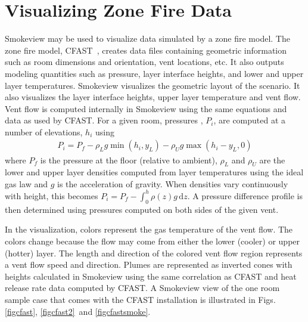 \documentclass[11pt,twoside]{book}
\begin{document}
\chapter{Visualizing Zone Fire Data}
Smokeview may be used to visualize data simulated by a zone fire
model. The zone fire model, CFAST~\cite{CFAST_Tech_Guide_6}, creates data
files containing geometric information such as room dimensions and
orientation, vent locations, etc.  It also outputs modeling
quantities such as pressure, layer interface heights, and lower
and upper layer temperatures. Smokeview visualizes the geometric
layout of the scenario.  It also visualizes the layer interface
heights, upper layer temperature and vent flow. Vent flow is
computed internally in Smokeview using the same equations and data
as used by CFAST.   For a given room, pressures , $P_i$, are
computed at a number of elevations, $h_i$ using
\begin{eqnarray}
P_i=P_f - \rho_L g \min(h_i,y_L) - \rho_U g \max(h_i-y_L,0)
\end{eqnarray}
where $P_f$ is the pressure at the floor (relative to ambient),
$\rho_L$ and $\rho_U$ are the lower and upper layer densities
computed from layer temperatures using the ideal gas law and $g$
is the acceleration of gravity.  When densities vary continuously
with height, this becomes $P_i=P_f-\int_0^h \rho(z)g\,\mbox{d}z$. A
pressure difference profile is then determined using pressures
computed on both sides of the given vent.

In the visualization, colors represent the gas temperature of the
vent flow.  The colors change because the flow may come from
either the lower (cooler) or upper (hotter) layer.   The length
and direction of the colored vent flow region represents a vent
flow speed and direction.  Plumes are represented as inverted
cones with heights calculated in Smokeview using the same
correlation as CFAST and heat release rate data computed by CFAST.
A Smokeview view of the one room sample case that comes with the
CFAST installation is illustrated in Figs. \ref{figcfast}, \ref{figcfast2}\ and \ref{figcfastsmoke}.
\end{document}
